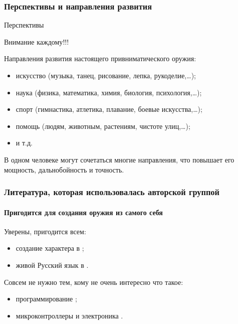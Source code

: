 \begin{frame}
    \frametitle{Перспективы и направления развития}
    
    \begin{block}{Перспективы}
        \begin{center}
            Внимание \alert{каждому}!!!
        \end{center}
    \end{block}
    
    Направления развития \alert{настоящего} привниматического оружия: 
    \begin{itemize}
        \item искусство (музыка, танец, рисование, лепка, рукоделие,\ldots);
        \item наука (физика, математика, химия, биология, психология,\ldots);
        \item спорт (гимнастика, атлетика, плавание, боевые искусства,\ldots);
        \item помощь (людям, животным, растениям, чистоте улиц,\ldots);
        \item и т.д.
    \end{itemize}
    
    \begin{block}{}
        \begin{center}
            В \alert{одном} человеке могут сочетаться \alert{многие} направления, что повышает его \alert{мощность}, \alert{дальнобойность} и \alert{точность}.
        \end{center}
    \end{block}
    
\end{frame}


\appendix

\begin{frame}
    \frametitle{Литература, которая использовалась авторской группой}
    \framesubtitle{Пригодится для создания оружия из самого себя}

    Уверены, пригодится \alert{всем}:
    \begin{itemize}
        \item создание характера в \cite{bib:kovey:sevenHabits};
        \item живой Русский язык в \cite{bib:gal:WordLiveAndDeath}.
    \end{itemize}
    
    \par\bigskip
    
    \alert{Совсем не нужно} тем, кому не очень интересно что такое:
    \begin{itemize}
        \item программирование \cite{bib:kernigan:practice};
        \item микроконтроллеры и электроника \cite{bib:margolis:Arduino}.
    \end{itemize}
\end{frame}

